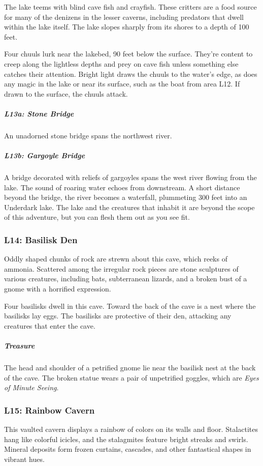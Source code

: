 \documentclass[10pt,a4paper,twoside,bg=print,twocolumn,openany,nodeprecatedcode]{dndbook}
\begin{document}
The lake teems with blind cave fish and crayfish. These critters are a food source for many of the denizens in the lesser caverns, including predators that dwell within the lake itself. The lake slopes sharply from its shores to a depth of 100 feet.

Four chuuls lurk near the lakebed, 90 feet below the surface. They're content to creep along the lightless depths and prey on cave fish unless something else catches their attention. Bright light draws the chuuls to the water's edge, as does any magic in the lake or near its surface, such as the boat from area L12. If drawn to the surface, the chuuls attack.

\subparagraph{L13a: Stone Bridge}
An unadorned stone bridge spans the northwest river.

\subparagraph{L13b: Gargoyle Bridge}
A bridge decorated with reliefs of gargoyles spans the west river flowing from the lake. The sound of roaring water echoes from downstream. A short distance beyond the bridge, the river becomes a waterfall, plummeting 300 feet into an Underdark lake. The lake and the creatures that inhabit it are beyond the scope of this adventure, but you can flesh them out as you see fit.

\subsubsection{L14: Basilisk Den}
\begin{DndReadAloud}{}
Oddly shaped chunks of rock are strewn about this cave, which reeks of ammonia. Scattered among the irregular rock pieces are stone sculptures of various creatures, including bats, subterranean lizards, and a broken bust of a gnome with a horrified expression.

\end{DndReadAloud}

Four basilisks dwell in this cave. Toward the back of the cave is a nest where the basilisks lay eggs. The basilisks are protective of their den, attacking any creatures that enter the cave.

\subparagraph{Treasure}
The head and shoulder of a petrified gnome lie near the basilisk nest at the back of the cave. The broken statue wears a pair of unpetrified goggles, which are \textit{Eyes of Minute Seeing}.

\subsubsection{L15: Rainbow Cavern}
\begin{DndReadAloud}{}
This vaulted cavern displays a rainbow of colors on its walls and floor. Stalactites hang like colorful icicles, and the stalagmites feature bright streaks and swirls. Mineral deposits form frozen curtains, cascades, and other fantastical shapes in vibrant hues.

\end{DndReadAloud}
\end{document}
